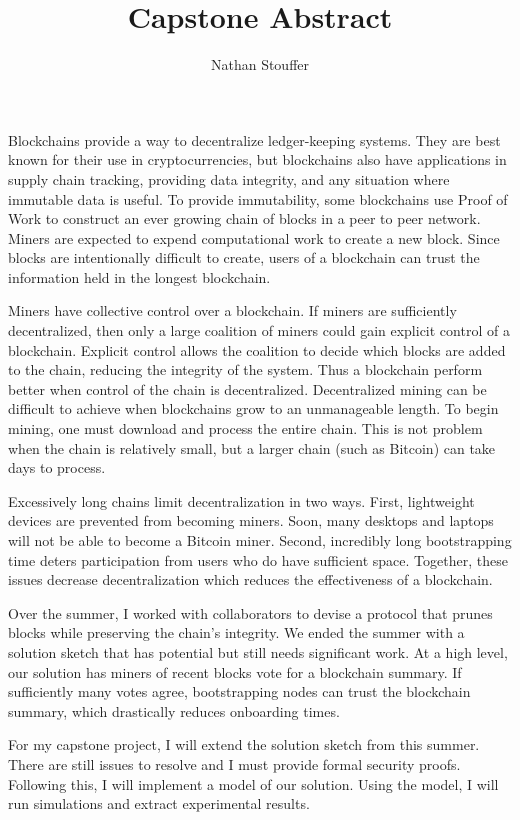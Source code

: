 \documentclass[11pt]{article}
\title{Capstone Abstract}
\author{Nathan Stouffer}
\date{}
\begin{document}
    \maketitle

    Blockchains provide a way to decentralize ledger-keeping systems.
    They are best known for their use in cryptocurrencies, but blockchains also have applications in supply chain tracking, providing data integrity, and any situation where immutable data is useful.
    To provide immutability, some blockchains use Proof of Work to construct an ever growing chain of blocks in a peer to peer network.
    Miners are expected to expend computational work to create a new block.
    Since blocks are intentionally difficult to create, users of a blockchain can trust the information held in the longest blockchain.

    Miners have collective control over a blockchain.
    If miners are sufficiently decentralized, then only a large coalition of miners could  gain explicit control of a blockchain.
    Explicit control allows the coalition to decide which blocks are added to the chain, reducing the integrity of the system.
    Thus a blockchain perform better when control of the chain is decentralized.
    Decentralized mining can be difficult to achieve when blockchains grow to an unmanageable length.
    To begin mining, one must download and process the entire chain.
    This is not problem when the chain is relatively small, but a larger chain (such as Bitcoin) can take days to process.

    Excessively long chains limit decentralization in two ways.
    First, lightweight devices are prevented from becoming miners.
    Soon, many desktops and laptops will not be able to become a Bitcoin miner.
    Second, incredibly long bootstrapping time deters participation from users who do have sufficient space.
    Together, these issues decrease decentralization which reduces the effectiveness of a blockchain.

    Over the summer, I worked with collaborators to devise a protocol that prunes blocks while preserving the chain's integrity.
    We ended the summer with a solution sketch that has potential but still needs significant work.
    At a high level, our solution has miners of recent blocks vote for a blockchain summary.
    If sufficiently many votes agree, bootstrapping nodes can trust the blockchain summary, which drastically reduces onboarding times.

    For my capstone project, I will extend the solution sketch from this summer.
    There are still issues to resolve and I must provide formal security proofs.
    Following this, I will implement a model of our solution.
    Using the model, I will run simulations and extract experimental results.
\end{document}
